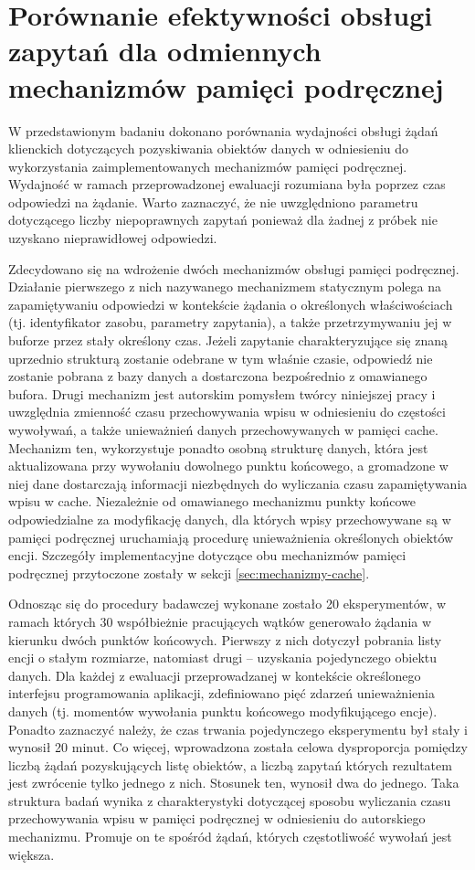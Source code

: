 \section{Porównanie efektywności obsługi zapytań dla odmiennych mechanizmów pamięci podręcznej}
W przedstawionym badaniu dokonano porównania wydajności obsługi żądań klienckich dotyczących pozyskiwania obiektów danych w odniesieniu do wykorzystania zaimplementowanych mechanizmów pamięci podręcznej. Wydajność w ramach przeprowadzonej ewaluacji rozumiana była poprzez czas odpowiedzi na żądanie. Warto zaznaczyć, że nie uwzględniono parametru dotyczącego liczby niepoprawnych zapytań ponieważ dla żadnej z próbek nie uzyskano nieprawidłowej odpowiedzi.

Zdecydowano się na wdrożenie dwóch mechanizmów obsługi pamięci podręcznej. Działanie pierwszego z nich nazywanego mechanizmem statycznym polega na zapamiętywaniu odpowiedzi w kontekście żądania o określonych właściwościach (tj. identyfikator zasobu, parametry zapytania), a także przetrzymywaniu jej w buforze przez stały określony czas. Jeżeli zapytanie charakteryzujące się znaną uprzednio strukturą zostanie odebrane w tym właśnie czasie, odpowiedź nie zostanie pobrana z bazy danych a dostarczona bezpośrednio z omawianego bufora. Drugi mechanizm jest autorskim pomysłem twórcy niniejszej pracy i uwzględnia zmienność czasu przechowywania wpisu w odniesieniu do częstości wywoływań, a także unieważnień danych przechowywanych w pamięci cache. Mechanizm ten, wykorzystuje ponadto osobną strukturę danych, która jest aktualizowana przy wywołaniu dowolnego punktu końcowego, a gromadzone w niej dane dostarczają informacji niezbędnych do wyliczania czasu zapamiętywania wpisu w cache. Niezależnie od omawianego mechanizmu punkty końcowe odpowiedzialne za modyfikację danych, dla których wpisy przechowywane są w pamięci podręcznej uruchamiają procedurę unieważnienia określonych obiektów encji. Szczegóły implementacyjne dotyczące obu mechanizmów pamięci podręcznej przytoczone zostały w sekcji \ref{sec:mechanizmy-cache}.

Odnosząc się do procedury badawczej wykonane zostało 20 eksperymentów, w ramach których 30 współbieżnie pracujących wątków generowało żądania w kierunku dwóch punktów końcowych. Pierwszy z nich dotyczył pobrania listy encji o stałym rozmiarze, natomiast drugi -- uzyskania pojedynczego obiektu danych. Dla każdej z ewaluacji przeprowadzanej w kontekście określonego interfejsu programowania aplikacji, zdefiniowano pięć zdarzeń unieważnienia danych (tj. momentów wywołania punktu końcowego modyfikującego encje). Ponadto zaznaczyć należy, że czas trwania pojedynczego eksperymentu był stały i wynosił 20 minut. Co więcej, wprowadzona została celowa dysproporcja pomiędzy liczbą żądań pozyskujących listę obiektów, a liczbą zapytań których rezultatem jest zwrócenie tylko jednego z nich. Stosunek ten, wynosił dwa do jednego. Taka struktura badań wynika z charakterystyki dotyczącej sposobu wyliczania czasu przechowywania wpisu w pamięci podręcznej w odniesieniu do autorskiego mechanizmu. Promuje on te spośród żądań, których częstotliwość wywołań jest większa.

